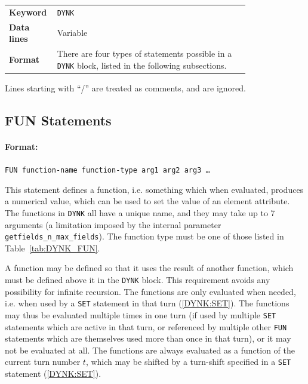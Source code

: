 \bigskip
\begin{tabular}{@{}lp{0.8\linewidth}}
    \textbf{Keyword}    & \texttt{DYNK} \\
    \textbf{Data lines} & Variable \\
    \textbf{Format}     & There are four types of statements possible in a \texttt{DYNK} block, listed in the following subsections.\\
\end{tabular}

\bigskip
\noindent Lines starting with ``/'' are treated as comments, and are ignored.

\subsection{FUN Statements} \label{DYNK:FUN}

\paragraph{Format:}
\texttt{FUN function-name function-type arg1 arg2 arg3 \ldots}

\bigskip
This statement defines a function, i.e. something which when evaluated, produces a numerical value, which can be used to set the value of an element attribute.
The functions in \texttt{DYNK} all have a unique name, and they may take up to 7 arguments (a limitation imposed by the internal parameter \texttt{getfields\_n\_max\_fields}).
The function type must be one of those listed in Table~\ref{tab:DYNK_FUN}.

A function may be defined so that it uses the result of another function, which must be defined above it in the \texttt{DYNK} block.
This requirement avoids any possibility for infinite recursion.
The functions are only evaluated when needed, i.e. when used by a \texttt{SET} statement in that turn (\ref{DYNK:SET}).
The functions may thus be evaluated multiple times in one turn (if used by multiple \texttt{SET} statements which are active in that turn, or referenced by multiple other \texttt{FUN} statements which are themselves used more than once in that turn), or it may not be evaluated at all.
The functions are always evaluated as a function of the current turn number $t$, which may be shifted by a turn-shift specified in a \texttt{SET} statement (\ref{DYNK:SET}).

